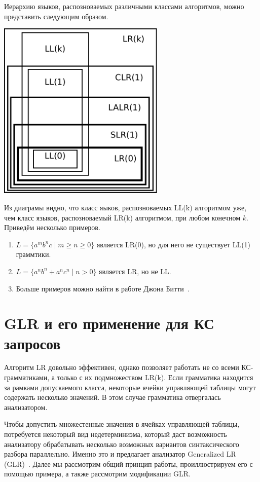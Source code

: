 Иерархию языков, распозноваемых различными классами алгоритмов, можно представить следующим образом.
\begin{center}
\includegraphics[width=0.6\textwidth]{pics/LL_LR.pdf}
\end{center}

Из диаграмы видно, что класс яыков, распозноваемых LL(k) алгоритмом уже, чем класс языков, распозноваемый LR(k) алгоритмом, при любом конечном $k$. Приведём несколько примеров.
\begin{enumerate}
\item $L = \{a^mb^nc \mid m \geq n \geq 0\} $ является LR(0), но для него не существует LL(1) граммтики. 
\item $L = \{ a^n b^n + a^n c^n \mid n > 0\}$ является LR, но не LL.
\item Больше примеров можно найти в работе Джона Битти~\cite{BEATTY1980193}.
\end{enumerate}

\section{GLR и его применение для КС запросов}

Алгоритм LR довольно эффективен, однако позволяет работать не со всеми КС-грамматиками, а только с их подмножеством LR(k). Если грамматика находится за рамками допускаемого класса, некоторые ячейки управляющей таблицы могут содержать несколько значений. В этом случае грамматика отвергалась анализатором.

Чтобы допустить множестенные значения в ячейках управляющей таблицы, потребуется некоторый вид недетерминизма, который даст возможность анализатору обрабатывать несколько возможных вариантов синтаксического разбора параллельно. Именно это и предлагает анализатор Generalized LR (GLR)~\cite{tomita-1987-efficient}. Далее мы рассмотрим общий принцип работы, проиллюстрируем его с помощью примера, а также рассмотрим модификации GLR.

